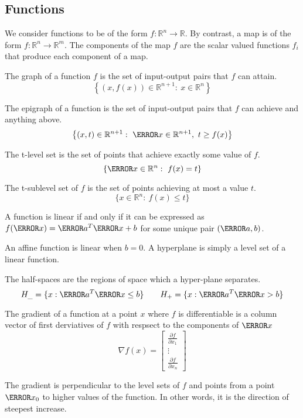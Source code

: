 \subsection{Functions}
We consider functions to be of the form $f:\mathbb{R}^n\rightarrow\mathbb{R}$.
By contrast, a map is of the form $f:\mathbb{R}^n\rightarrow\mathbb{R}^m$.
The components of the map $f$ are the scalar valued functions $f_i$ that produce each component of a map.
\begin{definition}
  The graph of a function $f$ is the set of input-output pairs that $f$ can attain.
  \[
	\left\{ (x, f(x))\in \mathbb{R}^{n+1}:\ x\in\mathbb{R}^n \right\}
  \]
  \label{defn:graph}
\end{definition}
\begin{definition}
  The epigraph of a function is the set of input-output pairs that $f$ can achieve and anything above.
  \[
	\left\{ (x,t) \in \mathbb{R}^{n+1}:\ \V{x}\in\mathbb{R}^{n+1},\ t\geq f(x) \right\}
  \]
  \label{defn:epigraph}
\end{definition}
\begin{definition}
  The t-level set is the set of points that achieve exactly some value of $f$.
  \[
	\{ \V{x}\in\mathbb{R}^n:\ f(x)=t \}
  \]
  \label{defn:level-set}
\end{definition}
\begin{definition}
  The t-sublevel set of $f$ is the set of points achieving at most a value $t$.
  \[
	\{ x\in\mathbb{R}^n:\ f(x)\leq t \}
  \]
  \label{defn:sublevel-set}
\end{definition}
\begin{theorem}
  A function is linear if and only if it can be expressed as $f(\V{x}) = \V{a}^T\V{x}+b$ for some unique pair $(\V{a}, b)$.
  \label{thm:linear-ip}
\end{theorem}
An affine function is linear when $b=0$. A hyperplane is simply a level set of a linear function.
\begin{definition}
  The half-spaces are the regions of space which a hyper-plane separates.
  \[
	H_{\_} = \{ x: \V{a}^T\V{x}\leq b \} \qquad H_{+} = \{ x: \V{a}^T\V{x} > b \}
  \]
  \label{defn:halfspace}
\end{definition}
\begin{definition}
  The gradient of a function at a point $x$ where $f$ is differentiable is a column vector of first derviatives of $f$ with respsect to the components of $\V{x}$
  \[
	\nabla f(x) = \begin{bmatrix}
	  \frac{\partial f}{\partial x_1}\\
	  \vdots\\
	  \frac{\partial f}{\partial x_n}
	\end{bmatrix}
  \]
  \label{defn:gradient}
\end{definition}
The gradient is perpendicular to the level sets of $f$ and points from a point $\V{x}_0$ to higher values of the function.
In other words, it is the direction of steepest increase.


